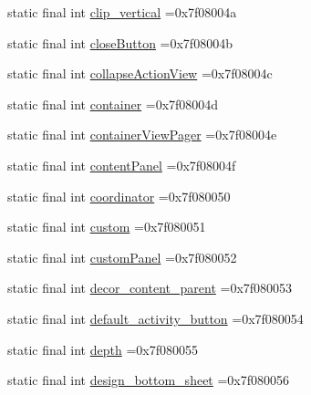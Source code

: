 \begin{DoxyCompactItemize}
\item 
static final int \mbox{\hyperlink{classcom_1_1example_1_1trainawearapplication_1_1_r_1_1id_a685a7f4cbf3da7f350b1be0ed91d843b}{clip\+\_\+vertical}} =0x7f08004a
\item 
static final int \mbox{\hyperlink{classcom_1_1example_1_1trainawearapplication_1_1_r_1_1id_a4df9a6a1faa14a939a150bb053daf823}{close\+Button}} =0x7f08004b
\item 
static final int \mbox{\hyperlink{classcom_1_1example_1_1trainawearapplication_1_1_r_1_1id_ab9d94f396c0fe51c45f88b12b5020167}{collapse\+Action\+View}} =0x7f08004c
\item 
static final int \mbox{\hyperlink{classcom_1_1example_1_1trainawearapplication_1_1_r_1_1id_a098ca51bf57d918825880bb2cf3e8a24}{container}} =0x7f08004d
\item 
static final int \mbox{\hyperlink{classcom_1_1example_1_1trainawearapplication_1_1_r_1_1id_aaa9aa19c2dea0875339dca2b2e2ef7ce}{container\+View\+Pager}} =0x7f08004e
\item 
static final int \mbox{\hyperlink{classcom_1_1example_1_1trainawearapplication_1_1_r_1_1id_aabcd606aa15c9203ea1468ba20b69ca4}{content\+Panel}} =0x7f08004f
\item 
static final int \mbox{\hyperlink{classcom_1_1example_1_1trainawearapplication_1_1_r_1_1id_abb595053992560987c7cf4dce39efe78}{coordinator}} =0x7f080050
\item 
static final int \mbox{\hyperlink{classcom_1_1example_1_1trainawearapplication_1_1_r_1_1id_a56de96451be85f57bdf15d16989b599d}{custom}} =0x7f080051
\item 
static final int \mbox{\hyperlink{classcom_1_1example_1_1trainawearapplication_1_1_r_1_1id_a0fafc6b4614fe1c326f9ad6a0828d45a}{custom\+Panel}} =0x7f080052
\item 
static final int \mbox{\hyperlink{classcom_1_1example_1_1trainawearapplication_1_1_r_1_1id_a44c9c8edd672db527454af0d15dccd7f}{decor\+\_\+content\+\_\+parent}} =0x7f080053
\item 
static final int \mbox{\hyperlink{classcom_1_1example_1_1trainawearapplication_1_1_r_1_1id_a26b3321d83f74c746f7689cebbfe72d4}{default\+\_\+activity\+\_\+button}} =0x7f080054
\item 
static final int \mbox{\hyperlink{classcom_1_1example_1_1trainawearapplication_1_1_r_1_1id_a4109b4e2eb535b8d22127966799643ac}{depth}} =0x7f080055
\item 
static final int \mbox{\hyperlink{classcom_1_1example_1_1trainawearapplication_1_1_r_1_1id_aba0dff1574cc8f2695708fff7d1adc92}{design\+\_\+bottom\+\_\+sheet}} =0x7f080056

\end{DoxyCompactItemize}
